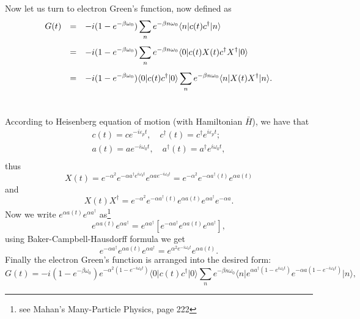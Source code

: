 \documentclass{book}
\newcommand{\bra}[1]{{\langle#1|}}
\newcommand{\ket}[1]{{|#1\rangle}}
\numberwithin{equation}{section}
\begin{document}
Now let us turn to electron Green's function, now defined as
\begin{equation}
  \begin{array}{rcl}
      G(t)&=&\displaystyle-i(1-e^{-\beta\omega_0})\sum_ne^{-\beta n\omega_0}
      \bra{n}c(t)c^\dag\ket{n}\\\vbox to 18pt{}
      &=&\displaystyle-i(1-e^{-\beta\omega_0})\sum_ne^{-\beta n\omega_0}
      \bra{0}c(t)X(t)c^\dag X^\dag\ket{0}\\\vbox to 18pt{}
      &=&\displaystyle-i(1-e^{-\beta\omega_0})\bra{0}c(t)c^\dag\ket{0}
      \sum_ne^{-\beta n\omega_0}\bra{n}X(t)X^\dag\ket{n}.\\\vbox to 18pt{}
  \end{array}
\end{equation}
According to Heisenberg equation of motion (with Hamiltonian
$\bar{H}$), we have that
\begin{equation}
  \begin{array}{l}
    c(t)=ce^{-i\varepsilon_pt},\quad c^\dag(t)=c^\dag e^{i\varepsilon_pt};\\
    a(t)=ae^{-i\omega_0t},\quad a^\dag(t)=a^\dag e^{i\omega_0t},\\
  \end{array}
\end{equation}
thus
\begin{equation}
  X(t)=e^{-\alpha^2}e^{-\alpha a^\dag e^{i\omega_0t}}e^{\alpha ae^{-i\omega_0t}}=
  e^{-\alpha^2}e^{-\alpha a^\dag(t)}e^{\alpha a(t)}
\end{equation}
and
\begin{equation}
  X(t)X^\dag=e^{-\alpha^2}e^{-\alpha a^\dag(t)}e^{\alpha a(t)}
  e^{\alpha a^\dag}e^{-\alpha a}.
\end{equation}
Now we write $e^{\alpha a(t)}e^{\alpha a^\dag}$ as\footnote{see Mahan's
  Many-Particle Physics, page 222}
\begin{equation}
  e^{\alpha a(t)}e^{\alpha a^\dag}=e^{\alpha a^\dag}[e^{-\alpha
      a^\dag}e^{\alpha a(t)}e^{\alpha a^\dag}],
\end{equation}
using Baker-Campbell-Hausdorff formula we get
\begin{equation}
  e^{-\alpha a^\dag}e^{\alpha a(t)}e^{\alpha a^\dag}=
  e^{\alpha^2e^{-i\omega_0t}}e^{\alpha a(t)}.
\end{equation}
Finally the electron Green's function is arranged into the desired form:
\begin{equation}
  G(t)=-i(1-e^{-\beta\omega_0})e^{-\alpha^2(1-e^{-i\omega_0t})}
  \bra{0}c(t)c^\dag\ket{0}\sum_ne^{-\beta n\omega_0}
  \bra{n}e^{\alpha a^\dag(1-e^{i\omega_0t})}e^{-\alpha a(1-e^{-i\omega_0t})}\ket{n},
\end{equation}
\end{document}
